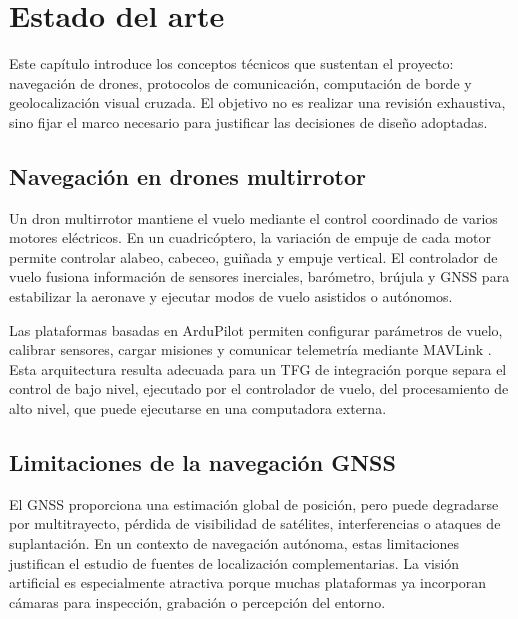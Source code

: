 
\chapter{Estado del arte}
\label{cap:estado-arte}

\begin{Resumen}
Este capítulo introduce los conceptos técnicos que sustentan el proyecto: navegación de drones, protocolos de comunicación, computación de borde y geolocalización visual cruzada. El objetivo no es realizar una revisión exhaustiva, sino fijar el marco necesario para justificar las decisiones de diseño adoptadas.
\end{Resumen}

\section{Navegación en drones multirrotor}
\label{sec:estado-navegacion-drones}

Un dron multirrotor mantiene el vuelo mediante el control coordinado de varios motores eléctricos. En un cuadricóptero, la variación de empuje de cada motor permite controlar alabeo, cabeceo, guiñada y empuje vertical. El controlador de vuelo fusiona información de sensores inerciales, barómetro, brújula y GNSS para estabilizar la aeronave y ejecutar modos de vuelo asistidos o autónomos.

Las plataformas basadas en ArduPilot permiten configurar parámetros de vuelo, calibrar sensores, cargar misiones y comunicar telemetría mediante MAVLink \parencite{ardupilot_docs,mavlink_docs}. Esta arquitectura resulta adecuada para un TFG de integración porque separa el control de bajo nivel, ejecutado por el controlador de vuelo, del procesamiento de alto nivel, que puede ejecutarse en una computadora externa.

\section{Limitaciones de la navegación GNSS}
\label{sec:estado-limitaciones-gnss}

El GNSS proporciona una estimación global de posición, pero puede degradarse por multitrayecto, pérdida de visibilidad de satélites, interferencias o ataques de suplantación. En un contexto de navegación autónoma, estas limitaciones justifican el estudio de fuentes de localización complementarias. La visión artificial es especialmente atractiva porque muchas plataformas ya incorporan cámaras para inspección, grabación o percepción del entorno.

